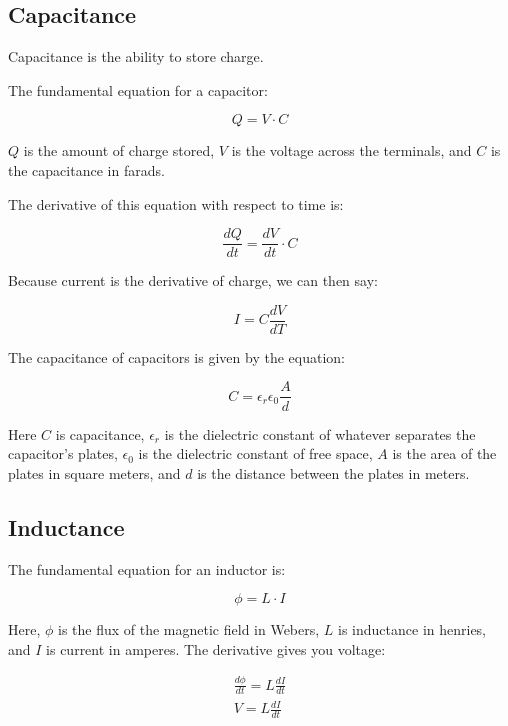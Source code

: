 \subsection{Capacitance}

Capacitance is the ability to store charge.

The fundamental equation for a capacitor:

\begin{equation}
Q = V\cdot C
\end{equation}

$Q$ is the amount of charge stored, $V$ is the voltage across the terminals, and $C$ is the capacitance in farads.

The derivative of this equation with respect to time is:

\begin{equation}
\frac{dQ}{dt} = \frac{dV}{dt}\cdot C
\end{equation}

Because current is the derivative of charge, we can then say:

\begin{equation}
I = C\frac{dV}{dT}
\end{equation}

The capacitance of capacitors is given by the equation:

\begin{equation}
C = \epsilon_r\epsilon_0\frac{A}{d}
\end{equation}

Here $C$ is capacitance, $\epsilon_r$ is the dielectric constant of whatever separates the capacitor's plates, $\epsilon_0$ is the dielectric constant of free space, $A$ is the area of the plates in square meters, and $d$ is the distance between the plates in meters.

\subsection{Inductance}

The fundamental equation for an inductor is:

\begin{equation}
\phi = L\cdot I
\end{equation}

Here, $\phi$ is the flux of the magnetic field in Webers, $L$ is inductance in henries, and $I$ is current in amperes.
The derivative gives you voltage:

\begin{align}
\frac{d\phi}{dt} = L\frac{dI}{dt} \\
V = L\frac{dI}{dt}
\end{align}

